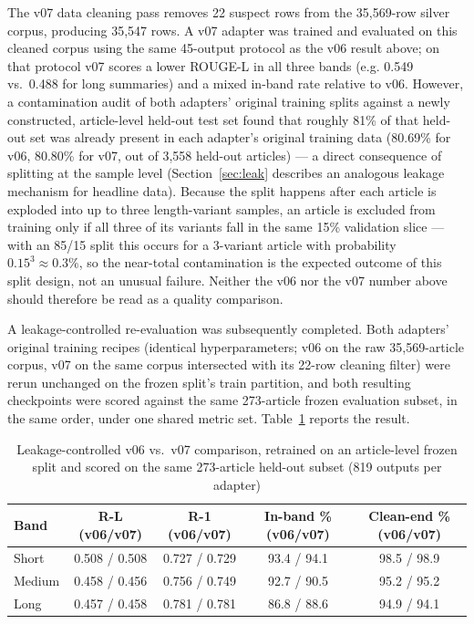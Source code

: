 \documentclass[a4paper,conference]{IEEEtran}
\begin{document}
The v07 data cleaning pass removes 22 suspect rows from the 35,569-row silver
corpus, producing 35,547 rows. A v07 adapter was trained and evaluated on
this cleaned corpus using the same 45-output protocol as the v06 result
above; on that protocol v07 scores a lower ROUGE-L in all three bands (e.g.
0.549 vs.\ 0.488 for long summaries) and a mixed in-band rate relative to
v06. However, a contamination audit of both adapters' original training
splits against a newly constructed, article-level held-out test set found
that roughly 81\% of that held-out set was already present in each
adapter's original training data (80.69\% for v06, 80.80\% for v07, out of
3,558 held-out articles) — a direct consequence of splitting at the
sample level (Section~\ref{sec:leak} describes an analogous leakage
mechanism for headline data). Because the split happens after each article
is exploded into up to three length-variant samples, an article is excluded
from training only if all three of its variants fall in the same 15\%
validation slice — with an 85/15 split this occurs for a 3-variant article
with probability $0.15^3 \approx 0.3\%$, so the near-total contamination is
the expected outcome of this split design, not an unusual failure. Neither
the v06 nor the v07 number above should therefore be read as a quality
comparison.

A leakage-controlled re-evaluation was subsequently completed. Both
adapters' original training recipes (identical hyperparameters; v06 on the
raw 35,569-article corpus, v07 on the same corpus intersected with its
22-row cleaning filter) were rerun unchanged on the frozen split's train
partition, and both resulting checkpoints were scored against the same
273-article frozen evaluation subset, in the same order, under one shared
metric set. Table~\ref{tab:summaryfrozen} reports the result.

\begin{table}[!t]
\caption{Leakage-controlled v06 vs.\ v07 comparison, retrained on an
article-level frozen split and scored on the same 273-article held-out
subset (819 outputs per adapter)}
\label{tab:summaryfrozen}
\centering
\footnotesize
\setlength{\tabcolsep}{2.6pt}
\renewcommand{\arraystretch}{1.04}
\begin{tabular}{|l|c|c|c|c|}
\hline
\textbf{Band} & \textbf{R-L (v06/v07)} & \textbf{R-1 (v06/v07)} & \textbf{In-band \% (v06/v07)} & \textbf{Clean-end \% (v06/v07)} \\
\hline
Short  & 0.508 / 0.508 & 0.727 / 0.729 & 93.4 / 94.1 & 98.5 / 98.9 \\
\hline
Medium & 0.458 / 0.456 & 0.756 / 0.749 & 92.7 / 90.5 & 95.2 / 95.2 \\
\hline
Long   & 0.457 / 0.458 & 0.781 / 0.781 & 86.8 / 88.6 & 94.9 / 94.1 \\
\hline
\end{tabular}
\end{table}
\end{document}
